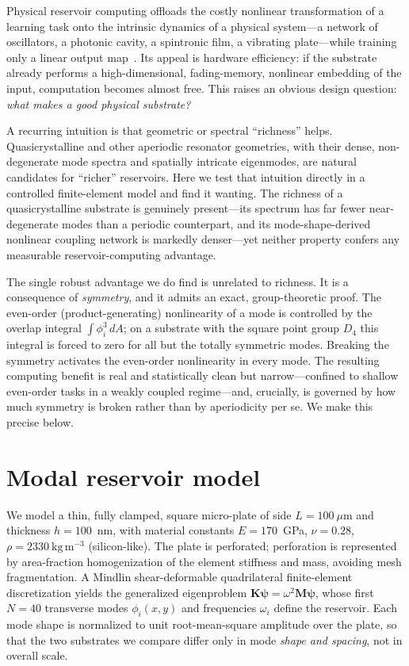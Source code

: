 \documentclass[aps,prapplied,reprint,amsmath,amssymb,floatfix]{revtex4-2}
\begin{document}
Physical reservoir computing offloads the costly nonlinear transformation of a
learning task onto the intrinsic dynamics of a physical system---a network of
oscillators, a photonic cavity, a spintronic film, a vibrating
plate---while training only a linear output map~\cite{jaeger2001,maass2002,tanaka2019}. Its appeal
is hardware efficiency: if the substrate already performs a high-dimensional,
fading-memory, nonlinear embedding of the input, computation becomes almost
free. This raises an obvious design question: \emph{what makes a good physical
substrate?}

A recurring intuition is that geometric or spectral ``richness'' helps.
Quasicrystalline and other aperiodic resonator geometries, with their dense,
non-degenerate mode spectra and spatially intricate eigenmodes, are natural
candidates for ``richer'' reservoirs. Here we test that intuition directly in
a controlled finite-element model and find it wanting. The richness of a
quasicrystalline substrate is genuinely present---its spectrum has far fewer
near-degenerate modes than a periodic counterpart, and its mode-shape-derived
nonlinear coupling network is markedly denser---yet neither property confers
any measurable reservoir-computing advantage.

The single robust advantage we do find is unrelated to richness. It is a
consequence of \emph{symmetry}, and it admits an exact, group-theoretic proof.
The even-order (product-generating) nonlinearity of a mode is controlled by the
overlap integral $\int\phi_i^3\,dA$; on a substrate with the square point
group $D_4$ this integral is forced to zero for all but the totally symmetric
modes. Breaking the symmetry activates the even-order nonlinearity in every
mode. The resulting computing benefit is real and statistically clean but
narrow---confined to shallow even-order tasks in a weakly coupled regime---and,
crucially, is governed by how much symmetry is broken rather than by
aperiodicity per se. We make this precise below.

\section{Modal reservoir model}

We model a thin, fully clamped, square micro-plate of side
$L=100~\mu$m and thickness $h=100$~nm, with material constants $E=170$~GPa,
$\nu=0.28$, $\rho=2330~\mathrm{kg\,m^{-3}}$ (silicon-like). The plate is
perforated; perforation is represented by area-fraction homogenization of the
element stiffness and mass, avoiding mesh fragmentation. A Mindlin
shear-deformable quadrilateral finite-element discretization yields the
generalized eigenproblem $\bm{K}\bm\psi=\omega^2\bm{M}\bm\psi$, whose first
$N=40$ transverse modes $\phi_i(x,y)$ and frequencies $\omega_i$ define the
reservoir. Each mode shape is normalized to unit root-mean-square amplitude
over the plate, so that the two substrates we compare differ only in mode
\emph{shape and spacing}, not in overall scale.
\end{document}
